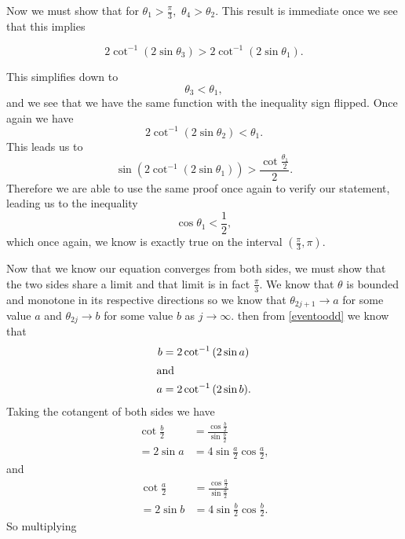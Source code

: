 \documentclass[12pt]{report}
\numberwithin{definition}{section}
\begin{document}
Now we must show that for $\theta_1 > \frac{\pi}{3},$ \hspace{2mm} $\theta_4 > \theta_2$. This result is immediate once we see that this implies 

\[
2\cot^{-1}{(2\sin{\theta_3})} > 2\cot^{-1}{(2\sin{\theta_1})} .
\]

This simplifies down to 
\[
\theta_3 < \theta_1,
\]
and we see that we have the same function with the inequality sign flipped. Once again we have 
\[
2\cot^{-1}{(2\sin{\theta_2})} < \theta_1.
\]
This leads us to 
\[
 \sin{ (2\cot^{-1}{(2\sin{\theta_1})})} > \frac{  \cot{ \frac{\theta_1} {2}}   }  {2}.
\]
Therefore we are able to use the same proof once again to verify our statement, leading us to the inequality 
\[
\cos{\theta_1} < \frac{1}{2},
\]
which once again, we know is exactly true on the interval $(\frac{\pi}{3 }, \pi)$.

    Now that we know our equation converges from both sides, we must show that the two sides share a limit and that limit is in fact $\frac{\pi}{3}$. We know that $\theta$ is bounded and monotone in its respective directions so we know that $\theta_{2j+1} \rightarrow a$ for some value $a$ and $\theta_{2j}\rightarrow b$ for some value $b$ as $j \rightarrow \infty$. then from \eqref{eventoodd} we know that  
	\begin{align*}
		b &= 2\cot^{-1}{(2\sin{a})}\\
		\intertext{and}
        a &= 2\cot^{-1}{(2\sin{b})} .
	\end{align*}
    Taking the cotangent of both sides we have
   	\begin{align*}
    \cot{\frac{b}{2}} &= \frac{\cos{\frac{b}{2}}}{\sin{\frac{b}{2}}}\\
    =2\sin{a} &=4\sin{\frac{a}{2}}\cos{\frac{a}{2}},
    	\end{align*}
    	and 
\begin{align*}
    \cot{\frac{a}{2}} &= \frac{\cos{\frac{a}{2}}}{\sin{\frac{a}{2}}}\\
    =2\sin{b} &=4\sin{\frac{b}{2}}\cos{\frac{b}{2}}.
\end{align*}
    	So multiplying 
    	
\end{document}
